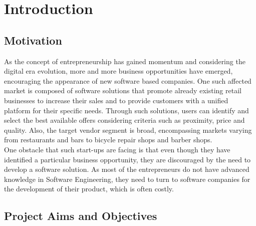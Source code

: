 \section{Introduction}

\subsection{Motivation} 

As the concept of entrepreneurship has gained momentum and considering the digital era evolution, more and more business opportunities have emerged, encouraging the appearance of new software based companies. One such affected market is composed of software solutions that promote already existing retail businesses to increase their sales and to provide customers with a unified platform for their specific needs. Through such solutions, users can identify and select the best available offers considering criteria such as proximity, price and quality. Also, the target vendor segment is broad, encompassing markets varying from restaurants and bars to bicycle repair shops and barber shops.\\

One obstacle that such start-ups are facing is that even though they have identified a particular business opportunity, they are discouraged by the need to develop a software solution. As most of the entrepreneurs do not have advanced knowledge in Software Engineering, they need to turn to software companies for the development of their product, which is often costly.\\

\subsection{Project Aims and Objectives}

